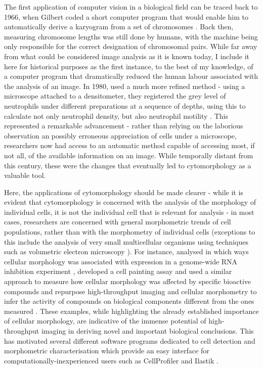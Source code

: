 The first application of computer vision in a biological field can be traced back to 1966, when Gilbert coded a short computer program that would enable him to automatically derive a karyogram from a set of chromosomes \cite{Gilbert1966-km}. Back then, measuring chromosome lengths was still done by humans, with the machine being only responsible for the correct designation of chromosomal pairs. While far away from what could be considered image analysis as it is known today, I include it here for historical purposes as the first instance, to the best of my knowledge, of a computer program that dramatically reduced the human labour associated with the analysis of an image. In 1980,  used a much more refined method - using a microscope attached to a densitometer, they registered the grey level of neutrophils under different preparations at a sequence of depths, using this to calculate not only neutrophil density, but also neutrophil motility \cite{Howe1980-ua}. This represented a remarkable advancement - rather than relying on the laborious observation an possibly erroneous appreciation of cells under a microscope, researchers now had access to an automatic method capable of accessing most, if not all, of the available information on an image. While temporally distant from this century, these were the changes that eventually led to cytomorphology as a valuable tool. 

Here, the applications of cytomorphology should be made clearer - while it is evident that cytomorphology is concerned with the analysis of the morphology of individual cells, it is not the individual cell that is relevant for analysis - in most cases, researchers are concerned with general morphometric trends of cell populations, rather than with the morphometry of individual cells (exceptions to this include the analysis of very small multicellular organisms using techniques such as volumetric electron microscopy \cite{Vergara2021-nx,Witvliet2021-gv}). For instance,  analysed in which ways cellular morphology was associated with expression in a genome-wide RNA inhibition experiment \cite{Fuchs2010-pk},  developed a cell painting assay and used a similar approach to measure how cellular morphology was affected by specific bioactive compounds \cite{Gustafsdottir2013-ul} and  repurpose high-throughput imaging and cellular morphometry to infer the activity of compounds on biological components different from the ones measured \cite{Simm2018}. These examples, while highlighting the already established importance of cellular morphology, are indicative of the immense potential of high-throughput imaging in deriving novel and important biological conclusions. This has motivated several different software programs dedicated to cell detection and morphometric characterisation which provide an easy interface for computationally-inexperienced users such as CellProfiler \cite{Carpenter2006-hy} and Ilastik \cite{Sommer2011-ds}.

